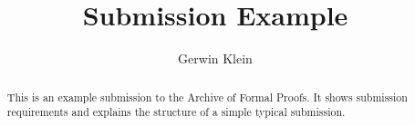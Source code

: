 \documentclass[11pt,a4paper]{article}
\begin{document}
\title{Submission Example}
\author{Gerwin Klein}
\maketitle

\begin{abstract}
  This is an example submission to the Archive of Formal Proofs. It
  shows submission requirements and explains the structure of a simple
  typical submission.
\end{abstract}

\tableofcontents





\end{document}

